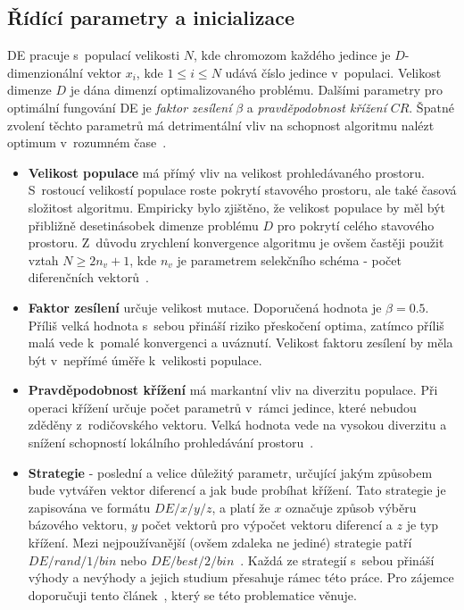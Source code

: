\subsection{Řídící parametry a inicializace}
DE pracuje s~populací velikosti $N$, kde chromozom každého jedince je $D$-dimenzionální vektor $x_{i}$, kde $1 \leq i \leq N$ udává číslo jedince v~populaci. Velikost dimenze $D$ je dána dimenzí optimalizovaného problému. Dalšími parametry pro optimální fungování DE je \textit{faktor zesílení} $\beta$ a \textit{pravděpodobnost křížení} $CR$. Špatné zvolení těchto parametrů má detrimentální vliv na schopnost algoritmu nalézt optimum v~rozumném čase~\cite{Weisser2010}.
\begin{itemize}
    \item \textbf{Velikost populace} má přímý vliv na velikost prohledávaného prostoru. S~rostoucí velikostí populace roste pokrytí stavového prostoru, ale také časová složitost algoritmu. Empiricky bylo zjištěno, že velikost populace by měl být přibližně desetinásobek dimenze problému $D$ pro pokrytí celého stavového prostoru. Z~důvodu zrychlení konvergence algoritmu je ovšem častěji použit vztah $N \ge 2n_v + 1$, kde $n_v$ je parametrem selekčního schéma - počet diferenčních vektorů~\cite{Weisser2010}.
    \item \textbf{Faktor zesílení} určuje velikost mutace. Doporučená hodnota je $\beta = 0.5$. Příliš velká hodnota s~sebou přináší riziko přeskočení optima, zatímco příliš malá vede k~pomalé konvergenci a uváznutí. Velikost faktoru zesílení by měla být v~nepřímé úměře k~velikosti populace.
    \item \textbf{Pravděpodobnost křížení} má markantní vliv na diverzitu populace. Při operaci křížení určuje počet parametrů v~rámci jedince, které nebudou zděděny z~rodičovského vektoru. Velká hodnota vede na vysokou diverzitu a snížení schopností lokálního prohledávání prostoru~\cite{Weisser2010}.
    \item \textbf{Strategie} - poslední a velice důležitý parametr, určující jakým způsobem bude vytvářen vektor diferencí a jak bude probíhat křížení. Tato strategie je zapisována ve formátu $DE/x/y/z$, a platí že $x$ označuje způsob výběru bázového vektoru, $y$ počet vektorů pro výpočet vektoru diferencí a $z$ je typ křížení. Mezi nejpoužívanější (ovšem zdaleka ne jediné) strategie patří $DE/rand/1/bin$ nebo $DE/best/2/bin$~\cite{EVO}. Každá ze strategií s~sebou přináší výhody a nevýhody a jejich studium přesahuje rámec této práce. Pro zájemce doporučuji tento článek~\cite{DE_MUTATIONS}, který se této problematice věnuje.
\end{itemize}

